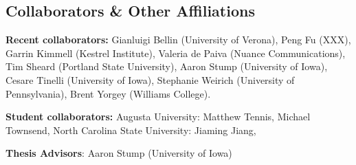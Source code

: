 \subsection*{Collaborators \& Other Affiliations}

\noindent

\textbf{Recent collaborators:} Gianluigi Bellin (University of
Verona), Peng Fu (XXX), Garrin Kimmell (Kestrel Institute), Valeria de
Paiva (Nuance Communications), Tim Sheard (Portland State University),
Aaron Stump (University of Iowa), Cesare Tinelli (University of Iowa),
Stephanie Weirich (University of Pennsylvania), Brent Yorgey (Williams
College). 

\textbf{Student collaborators:} Augusta University: Matthew Tennis,
Michael Townsend, North Carolina State University: Jiaming Jiang,


\textbf{Thesis Advisors}: Aaron Stump (University of Iowa)
